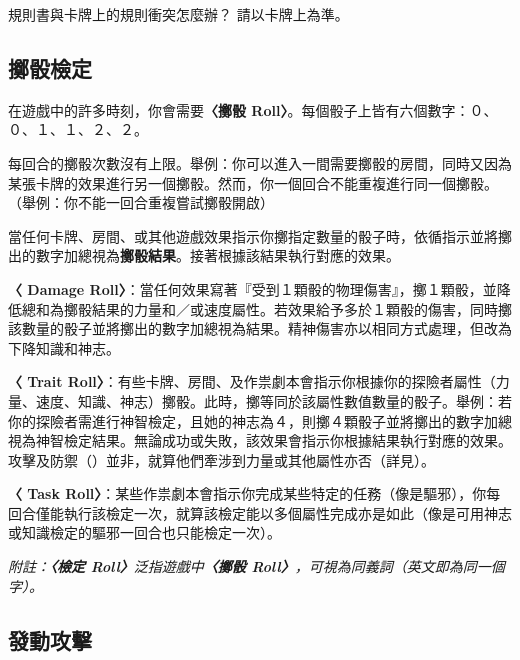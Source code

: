 \begin{RuleBox}{規則書與卡牌上的規則衝突怎麼辦？}
  請以卡牌上為準。
\end{RuleBox}


\subsection{擲骰檢定}

在遊戲中的許多時刻，你會需要\textbf{〈擲骰 Roll〉}。每個骰子上皆有六個數字：０、０、１、１、２、２。

每回合的擲骰次數沒有上限。舉例：你可以進入一間需要擲骰的房間，同時又因為某張卡牌的效果進行另一個擲骰。然而，你一個回合不能重複進行同一個擲骰。（舉例：你不能一回合重複嘗試擲骰開啟）

當任何卡牌、房間、或其他遊戲效果指示你擲指定數量的骰子時，依循指示並將擲出的數字加總視為\textbf{擲骰結果}。接著根據該結果執行對應的效果。

\textbf{〈 Damage Roll〉}：當任何效果寫著『受到１顆骰的物理傷害』，擲１顆骰，並降低總和為擲骰結果的力量和／或速度屬性。若效果給予多於１顆骰的傷害，同時擲該數量的骰子並將擲出的數字加總視為結果。精神傷害亦以相同方式處理，但改為下降知識和神志。

\textbf{〈 Trait Roll〉}：有些卡牌、房間、及作祟劇本會指示你根據你的探險者屬性（力量、速度、知識、神志）擲骰。此時，擲等同於該屬性數值數量的骰子。舉例：若你的探險者需進行神智檢定，且她的神志為４，則擲４顆骰子並將擲出的數字加總視為神智檢定結果。無論成功或失敗，該效果會指示你根據結果執行對應的效果。攻擊及防禦（）並非，就算他們牽涉到力量或其他屬性亦否（詳見）。

\textbf{〈 Task Roll〉}：某些作祟劇本會指示你完成某些特定的任務（像是驅邪），你每回合僅能執行該檢定一次，就算該檢定能以多個屬性完成亦是如此（像是可用神志或知識檢定的驅邪一回合也只能檢定一次）。

\emph{附註：\textbf{〈檢定 Roll〉}泛指遊戲中\textbf{〈擲骰 Roll〉}，可視為同義詞（英文即為同一個字）。}


\subsection{發動攻擊} \label{ssec:make-an-attack}

